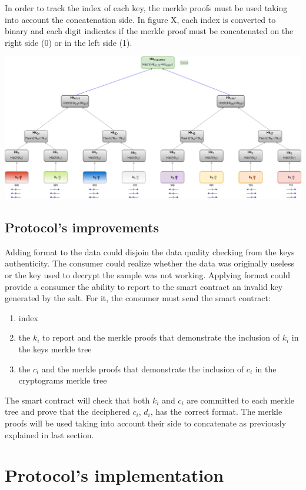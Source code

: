 \documentclass[]{article}
\begin{document}
	
	In order to track the index of each key, the merkle proofs must be used taking into account the concatenation side. In figure X, each index is converted to binary and each digit indicates if the merkle proof must be concatenated on the right side (0) or in the left side (1).
	
	\includegraphics[width=\textwidth,height=\textheight,keepaspectratio]{../figures/KeysMerkleTree_index}

	\subsection{Protocol's improvements}
	Adding format to the data could disjoin the data quality checking from the keys authenticity. The consumer could realize whether the data was originally useless or the key used to decrypt the sample was not working.
	Applying format could provide a consumer the ability to report to the smart contract an invalid key generated by the salt. For it, the consumer must send the smart contract:
	\begin{enumerate}
		 \item index
		 \item the $k_i$ to report and the merkle proofs that demonstrate the inclusion of $k_i$ in the keys merkle tree
		 \item the $c_i$ and the merkle proofs that demonstrate the inclusion of $c_i$ in the cryptograms merkle tree
	\end{enumerate}
	
	The smart contract will check that both $k_i$ and $c_i$ are committed to each merkle tree and prove that the deciphered $c_i$, $d_i$, has the correct format. The merkle proofs will be used taking into account their side to concatenate as previously explained in last section.
	
	
	\section{Protocol's implementation}
	
\end{document}
